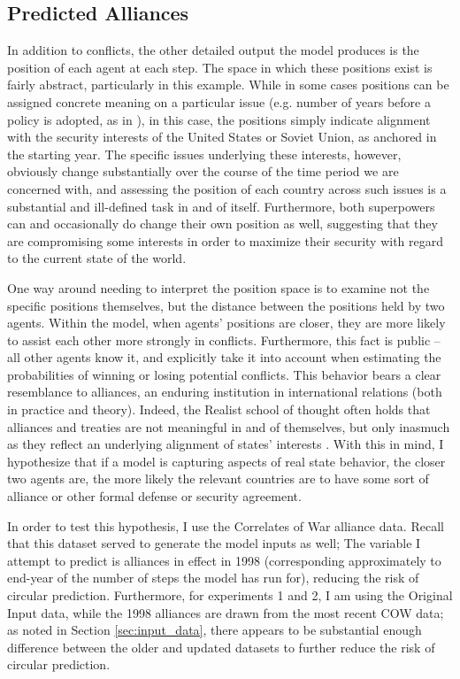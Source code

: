 \subsection{Predicted Alliances}

In addition to conflicts, the other detailed output the model produces is the position of each agent at each step. The space in which these positions exist is fairly abstract, particularly in this example. While in some cases positions can be assigned concrete meaning on a particular issue (e.g. number of years before a policy is adopted, as in \citet{stokman_1994b}), in this case, the positions simply indicate alignment with the security interests of the United States or Soviet Union, as anchored in the starting year. The specific issues underlying these interests, however, obviously change substantially over the course of the time period we are concerned with, and assessing the position of each country across such issues is a substantial and ill-defined task in and of itself. Furthermore, both superpowers can and occasionally do change their own position as well, suggesting that they are compromising some interests in order to maximize their security with regard to the current state of the world.

One way around needing to interpret the position space is to examine not the specific positions themselves, but the distance between the positions held by two agents. Within the model, when agents' positions are closer, they are more likely to assist each other more strongly in conflicts. Furthermore, this fact is public -- all other agents know it, and explicitly take it into account when estimating the probabilities of winning or losing potential conflicts. This behavior bears a clear resemblance to alliances, an enduring institution in international relations (both in practice and theory). Indeed, the Realist school of thought often holds that alliances and treaties are not meaningful in and of themselves, but only inasmuch as they reflect an underlying alignment of states' interests \citep{walt_1987}. With this in mind, I hypothesize that if a model is capturing aspects of real state behavior, the closer two agents are, the more likely the relevant countries are to have some sort of alliance or other formal defense or security agreement.

In order to test this hypothesis, I use the Correlates of War \citep{gibler_2009,gibler_2013} alliance data. Recall that this dataset served to generate the model inputs as well; The variable I attempt to predict is alliances in effect in 1998 (corresponding approximately to end-year of the number of steps the model has run for), reducing the risk of circular prediction. Furthermore, for experiments 1 and 2, I am using the Original Input data, while the 1998 alliances are drawn from the most recent COW data; as noted in Section \ref{sec:input_data}, there appears to be substantial enough difference between the older and updated datasets to further reduce the risk of circular prediction.


